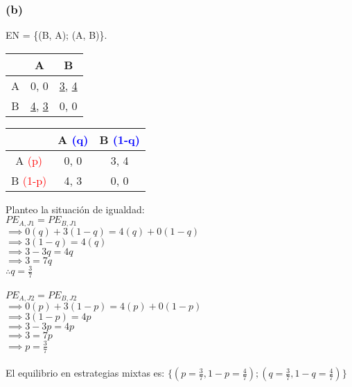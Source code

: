 \documentclass{article}
\newcommand{\ulcolor}[2][Red]{\setulcolor{#1}\ul{#2}}
\begin{document}
            \subsubsection*{(b)}
                EN = \{(B, A); (A, B)\}.
                \begin{table}[H]
                    \begin{tabular}{|c|c|c|}
                        \hline
                            & A & B \\ \hline
                        A & 0, 0 & \ulcolor[red]{3}, \ulcolor[blue]{4} \\ 
                        B & \ulcolor[red]{4}, \ulcolor[blue]{3} & 0, 0 \\ \hline
                    \end{tabular}
                \end{table}
                \begin{table}[H]
                    \begin{tabular}{|c|c|c|}
                        \hline
                            & A \textcolor{blue}{(q)} & B \textcolor{blue}{(1-q)} \\ \hline
                        A \textcolor{red}{(p)} & 0, 0 & 3, 4 \\ 
                        B \textcolor{red}{(1-p)} & 4, 3 & 0, 0 \\ \hline
                    \end{tabular}
                \end{table}
                Planteo la situación de igualdad: \\
                \(PE_{A, J1} = PE_{B, J1}\) \\
                \(\implies 0(q) + 3(1-q) = 4(q) + 0(1-q)\) \\
                \(\implies 3(1-q) = 4(q)\) \\
                \(\implies 3-3q = 4q\) \\
                \(\implies 3 = 7q\) \\
                \(\therefore q = \frac{3}{7}\) \\
                \\
                \(PE_{A, J2} = PE_{B, J2}\) \\
                \(\implies 0(p)+3(1-p) = 4(p)+0(1-p)\) \\
                \(\implies 3(1-p) = 4p\) \\
                \(\implies 3-3p = 4p\) \\
                \(\implies 3 = 7p\) \\
                \(\implies p = \frac{3}{7}\) \\
                \\
                El equilibrio en estrategias mixtas es: \(\{(p = \frac{3}{7}, 1-p = \frac{4}{7});(q = \frac{3}{7}, 1-q = \frac{4}{7})\}\)
\end{document}
